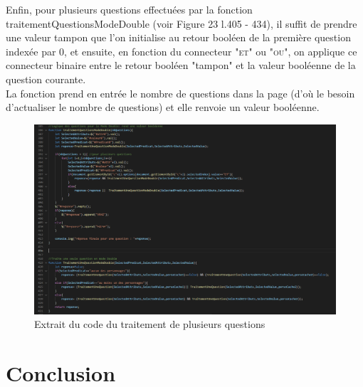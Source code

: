 \documentclass{article}
\begin{document}
                Enfin, pour plusieurs questions effectuées par la fonction traitementQuestionsModeDouble (voir Figure 23  l.405 - 434), il suffit de prendre une valeur tampon que l'on initialise au retour booléen de la première question indexée par 0, et ensuite, en fonction du connecteur "\textsc{et}" ou "\textsc{ou}", on applique ce connecteur binaire entre le retour booléen "tampon" et la valeur booléenne de la question courante.\\
                La fonction prend en entrée le nombre de questions dans la page (d'où le besoin d'actualiser le nombre de questions) et elle renvoie un valeur booléenne.
            \begin{figure}[h]
                \centering
                \includegraphics[width=15cm]{images/TraitementQuestionModeDouble.png}
                \caption{Extrait du code du traitement de plusieurs questions}
            \end{figure}
            
    \pagebreak
            
    \section{Conclusion}
\end{document}
